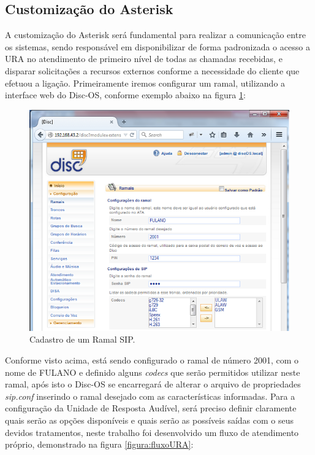 \subsection{Customização do Asterisk}

A customização do Asterisk será fundamental para realizar a comunicação entre os sistemas, sendo responsável em disponibilizar de forma padronizada o acesso a URA no atendimento de primeiro nível de todas as chamadas recebidas, e disparar solicitações a recursos externos conforme a necessidade do cliente que efetuou a ligação.
Primeiramente iremos configurar um ramal, utilizando a interface web do Disc-OS, conforme exemplo abaixo na figura \ref{figura:cadastroRamapSIP}:


\begin{figure}[H]
	\centering
	\caption{Cadastro de um Ramal SIP.}	
	\label{figura:cadastroRamapSIP}
	\includegraphics{figuras/cadastro_ramal_sip.png}
\end{figure}


Conforme visto acima, está sendo configurado o ramal de número 2001, com o nome de FULANO e definido alguns \textit{codecs} que serão permitidos utilizar neste ramal, após isto o Disc-OS se encarregará de alterar o arquivo de propriedades \textit{sip.conf} inserindo o ramal desejado com as características informadas.
Para a configuração da Unidade de Resposta Audível, será preciso definir claramente quais serão as opções disponíveis e quais serão as possíveis saídas com o seus devidos tratamentos, neste trabalho foi desenvolvido um fluxo de atendimento próprio, demonstrado na figura \ref{figura:fluxoURA}: 

